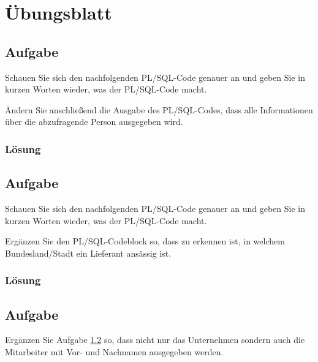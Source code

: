 \section{Übungsblatt}
\label{sec:uebung_06}

\subsection{Aufgabe}
\label{sec:uebung_06.aufgabe_01}
Schauen Sie sich den nachfolgenden PL/SQL-Code genauer an und geben Sie in kurzen Worten wieder, was der PL/SQL-Code macht.

Ändern Sie anschließend die Ausgabe des PL/SQL-Codes, dass alle Informationen über die abzufragende Person ausgegeben wird.


\subsubsection*{Lösung}
\label{sec:uebung_06.aufgabe_01.loesung}

\subsection{Aufgabe}
\label{sec:uebung_06.aufgabe_02}
Schauen Sie sich den nachfolgenden PL/SQL-Code genauer an und geben Sie in kurzen Worten wieder, was der PL/SQL-Code macht.

Ergänzen Sie den PL/SQL-Codeblock so, dass zu erkennen ist, in welchem Bundesland/Stadt ein Lieferant ansässig ist.


\subsubsection*{Lösung}
\label{sec:uebung_06.aufgabe_02.loesung}

\subsection{Aufgabe}
\label{sec:uebung_06.aufgabe_03}
Ergänzen Sie Aufgabe \ref{sec:uebung_06.aufgabe_02} so, dass nicht nur das Unternehmen sondern auch die Mitarbeiter mit Vor- und Nachnamen ausgegeben werden.

